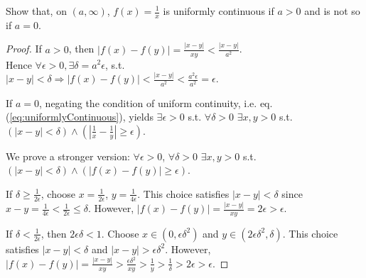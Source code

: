 \begin{exc}
  Show that, on $(a,\infty)$,
  $f(x)=\frac{1}{x}$ is uniformly continuous
   if $a>0$ 
   and is not so if $a=0$.
\end{exc}
\begin{proof}
  If $a>0$, then
  $|f(x)-f(y)|=\frac{|x-y|}{xy} %
  <\frac{|x-y|}{a^2}$.\\
  Hence 
  $\forall \epsilon>0, \exists \delta=a^2 \epsilon$,
  s.t. \\$|x-y|<\delta \Rightarrow
  |f(x)-f(y)|<\frac{|x-y|}{a^2}<\frac{a^2 \epsilon}{a^2}=\epsilon$.

  If $a=0$, negating the condition
   of uniform continuity,
   i.e. eq. (\ref{eq:uniformlyContinuous}), yields
  $\exists \epsilon>0$ s.t. $\forall\delta>0$
   $\exists x,y>0$ s.t.
   $(|x-y|<\delta) \wedge (|\frac{1}{x}-\frac{1}{y}|\ge \epsilon)$.

   We prove a stronger version:
  $\forall \epsilon>0$, $\forall\delta>0$
   $\exists x,y>0$ s.t.
   $(|x-y|<\delta) \wedge (|f(x)-f(y)|\ge \epsilon)$.

  If $\delta\ge \frac{1}{2\epsilon}$,
   choose $x=\frac{1}{2\epsilon}$, $y=\frac{1}{4\epsilon}$.
  This choice satisfies $|x-y|<\delta$
   since $x-y=\frac{1}{4\epsilon}<\frac{1}{2\epsilon}\le \delta$.
  However, $|f(x)-f(y)|=\frac{|x-y|}{xy}=2\epsilon>\epsilon$.

  If $\delta< \frac{1}{2\epsilon}$,
   then $2\epsilon\delta<1$.
  Choose $x\in (0, \epsilon\delta^2)$
   and $y\in (2\epsilon\delta^2, \delta)$.
  This choice satisfies $|x-y|<\delta$
   and $|x-y|>\epsilon\delta^2$.
  However, 
   $|f(x)-f(y)|=\frac{|x-y|}{xy}>\frac{\epsilon\delta^2}{xy}
   > \frac{1}{y} > \frac{1}{\delta} > 2\epsilon> \epsilon$.
\end{proof}

